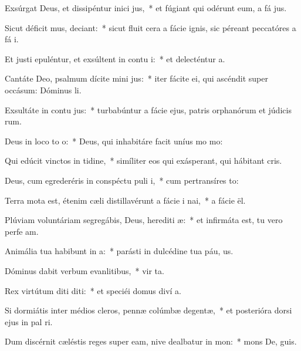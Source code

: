 \item Exsúrgat Deus, et dissipéntur inici jus,~* et fúgiant qui odérunt eum, a fá jus.
\item Sicut déficit mus, deciant:~* sicut fluit cera a fácie ignis, sic péreant peccatóres a fá i.
\item Et justi epuléntur, et exsúltent in contu i:~* et delecténtur  a.
\item Cantáte Deo, psalmum dícite mini jus:~* iter fácite ei, qui ascéndit super occásum: Dóminus  li.
\item Exsultáte in contu jus:~* turbabúntur a fácie ejus, patris orphanórum et júdicis rum.
\item Deus in loco to o:~* Deus, qui inhabitáre facit uníus mo  mo:
\item Qui edúcit vinctos in tidine,~* simíliter eos qui exásperant, qui hábitant  cris.
\item Deus, cum egrederéris in conspéctu puli i,~* cum pertransíres  to:
\item Terra mota est, étenim cæli distillavérunt a fácie i nai,~* a fácie  ël.
\item Plúviam voluntáriam segregábis, Deus, herediti æ:~* et infirmáta est, tu vero perfe am.
\item Animália tua habibunt in a:~* parásti in dulcédine tua páu, us.
\item Dóminus dabit verbum evanlitibus,~* vir ta.
\item Rex virtútum diti diti:~* et speciéi domus diví a.
\item Si dormiátis inter médios cleros, pennæ colúmbæ degentæ,~* et posterióra dorsi ejus in pal ri.
\item Dum discérnit cæléstis reges super eam, nive dealbatur in mon:~* mons De,  guis.
